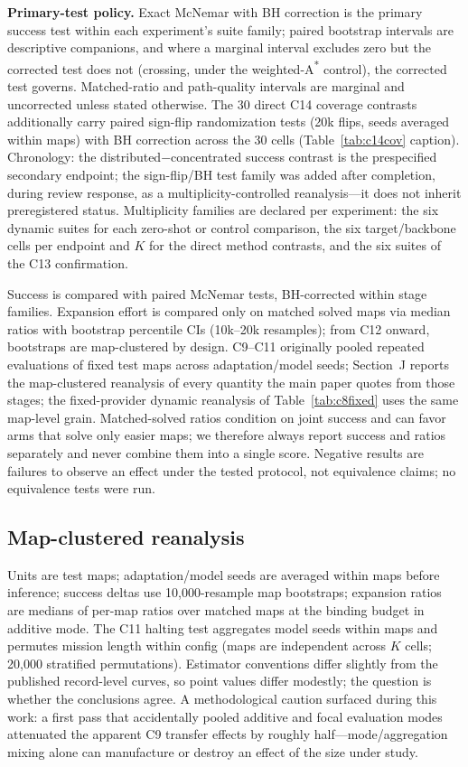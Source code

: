 \documentclass[letterpaper]{article} %
\newcommand{\stage}[1]{\textsc{#1}}
\begin{document}
\textbf{Primary-test policy.} Exact McNemar with BH correction is the primary success test within each experiment's suite family; paired bootstrap intervals are descriptive companions, and where a marginal interval excludes zero but the corrected test does not (crossing, under the weighted-A\textsuperscript{*} control), the corrected test governs. Matched-ratio and path-quality intervals are marginal and uncorrected unless stated otherwise. The 30 direct \stage{C14} coverage contrasts additionally carry paired sign-flip randomization tests (20k flips, seeds averaged within maps) with BH correction across the 30 cells (Table~\ref{tab:c14cov} caption). Chronology: the distributed$-$concentrated success contrast is the prespecified secondary endpoint; the sign-flip/BH test family was added after completion, during review response, as a multiplicity-controlled reanalysis---it does not inherit preregistered status. Multiplicity families are declared per experiment: the six dynamic suites for each zero-shot or control comparison, the six target/backbone cells per endpoint and $K$ for the direct method contrasts, and the six suites of the \stage{C13} confirmation.

Success is compared with paired McNemar tests, BH-corrected within stage families. Expansion effort is compared only on matched solved maps via median ratios with bootstrap percentile CIs (10k--20k resamples); from \stage{C12} onward, bootstraps are map-clustered by design. \stage{C9}--\stage{C11} originally pooled repeated evaluations of fixed test maps across adaptation/model seeds; Section~J reports the map-clustered reanalysis of every quantity the main paper quotes from those stages; the fixed-provider dynamic reanalysis of Table~\ref{tab:c8fixed} uses the same map-level grain. Matched-solved ratios condition on joint success and can favor arms that solve only easier maps; we therefore always report success and ratios separately and never combine them into a single score. Negative results are failures to observe an effect under the tested protocol, not equivalence claims; no equivalence tests were run.

\subsection{Map-clustered reanalysis}

Units are test maps; adaptation/model seeds are averaged within maps before inference; success deltas use 10{,}000-resample map bootstraps; expansion ratios are medians of per-map ratios over matched maps at the binding budget in additive mode. The \stage{C11} halting test aggregates model seeds within maps and permutes mission length within config (maps are independent across $K$ cells; 20{,}000 stratified permutations). Estimator conventions differ slightly from the published record-level curves, so point values differ modestly; the question is whether the conclusions agree. A methodological caution surfaced during this work: a first pass that accidentally pooled additive and focal evaluation modes attenuated the apparent \stage{C9} transfer effects by roughly half---mode/aggregation mixing alone can manufacture or destroy an effect of the size under study.
\end{document}
